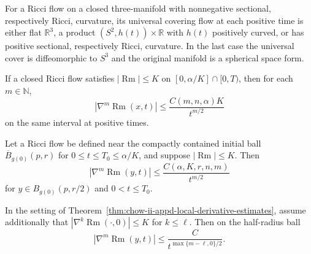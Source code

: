 \begin{theorem}
\label{thm:chow-ii-appd-three-manifold-curvature-rigidity}


For a Ricci flow on a closed three-manifold with nonnegative sectional,
respectively Ricci, curvature, its universal covering flow at each positive
time is either flat $\mathbb R^3$, a product $(S^2,h(t))\times\mathbb R$ with
$h(t)$ positively curved, or has positive sectional, respectively Ricci,
curvature. In the last case the universal cover is diffeomorphic to $S^3$ and
the original manifold is a spherical space form.
\end{theorem}

\begin{theorem}
\label{thm:chow-ii-appd-global-derivative-estimates}

If a closed Ricci flow satisfies $|\operatorname{Rm}|\leq K$ on
$[0,\alpha/K]\cap[0,T)$, then for each $m\in\mathbb N$,
\[
 |\nabla^m\operatorname{Rm}(x,t)|\leq
 \frac{C(m,n,\alpha)K}{t^{m/2}}
\]
on the same interval at positive times.
\end{theorem}

\begin{theorem}
\label{thm:chow-ii-appd-local-derivative-estimates}


Let a Ricci flow be defined near the compactly contained initial ball
$\overline B_{g(0)}(p,r)$ for $0\leq t\leq T_0\leq\alpha/K$, and suppose
$|\operatorname{Rm}|\leq K$. Then
\[
 |\nabla^m\operatorname{Rm}(y,t)|\leq
 \frac{C(\alpha,K,r,n,m)}{t^{m/2}}
\]
for $y\in B_{g(0)}(p,r/2)$ and $0<t\leq T_0$.
\end{theorem}

\begin{theorem}
\label{thm:chow-ii-appd-modified-global-derivative-estimates}


In the setting of Theorem~\ref{thm:chow-ii-appd-local-derivative-estimates},
assume additionally that $|\nabla^k\operatorname{Rm}(\cdot,0)|\leq K$ for
$k\leq\ell$. Then on the half-radius ball
\[
 |\nabla^m\operatorname{Rm}(y,t)|\leq
 \frac C{t^{\max\{m-\ell,0\}/2}}.
\]
\end{theorem}

